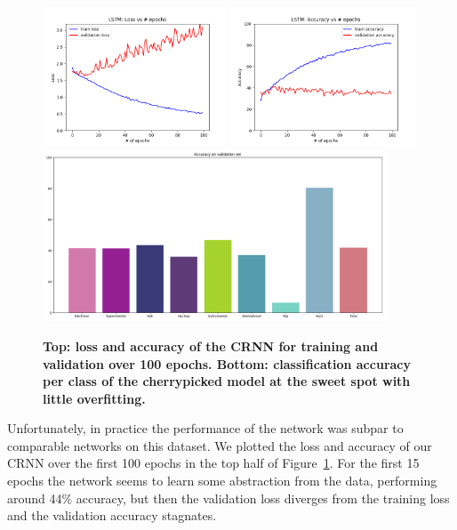     \begin{figure}[t]
        \centering
        \includegraphics[width=0.49\textwidth]{images/loss}
        \includegraphics[width=0.49\textwidth]{images/acc}
        \includegraphics[width=0.91\textwidth]{images/val_acc}
        \caption{\textbf{Top: loss and accuracy of the CRNN for training and validation over 100 epochs. Bottom: classification accuracy per class of the cherrypicked model at the sweet spot with little overfitting.}}
        \label{performance}
    \end{figure}

    Unfortunately, in practice the performance of the network was subpar to comparable networks on this dataset.
    We plotted the loss and accuracy of our CRNN over the first 100 epochs in the top half of Figure~\ref{performance}.
    For the first 15 epochs the network seems to learn some abstraction from the data, performing around 44$\%$ accuracy, but then the validation loss diverges from the training loss and the validation accuracy stagnates.


